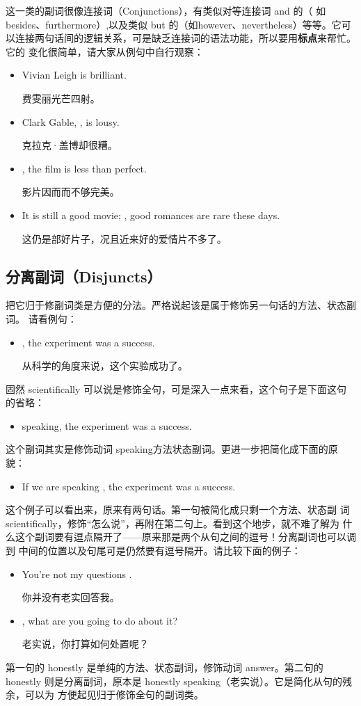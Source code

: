 这一类的副词很像连接词（Conjunctions），有类似对等连接词 and 的（
如besides、furthermore）,以及类似 but 的（如however、nevertheless）等等。它可
以连接两句话间的逻辑关系，可是缺乏连接词的语法功能，所以要用\textbf{标点}来帮忙。它的
变化很简单，请大家从例句中自行观察：

\begin{itemize}
\item Vivian Leigh is brilliant.

  费雯丽光芒四射。
\item Clark Gable, , is lousy.

  克拉克·盖博却很糟。
\item {}, the film is less than perfect.

  影片因而而不够完美。
\item  It is still a good movie; , good romances are rare these days.

  这仍是部好片子，况且近来好的爱情片不多了。
\end{itemize}

\subsection{分离副词（Disjuncts）}

把它归于修副词类是方便的分法。严格说起该是属于修饰另一句话的方法、状态副词。
请看例句：
\begin{itemize}
\item  {}, the experiment was a success.

  从科学的角度来说，这个实验成功了。
\end{itemize}
固然 scientifically 可以说是修饰全句，可是深入一点来看，这个句子是下面这句的省略：
\begin{itemize}
\item  {} speaking, the experiment was a success.
\end{itemize}
这个副词其实是修饰动词 speaking方法状态副词。更进一步把简化成下面的原貌：
\begin{itemize}
\item  If we are speaking , the experiment was a success.
\end{itemize}
这个例子可以看出来，原来有两句话。第一句被简化成只剩一个方法、状态副
词scientifically，修饰“怎么说”，再附在第二句上。看到这个地步，就不难了解为
什么这个副词要有逗点隔开了——原来那是两个从句之间的逗号！分离副词也可以调到
中间的位置以及句尾可是仍然要有逗号隔开。请比较下面的例子：
\begin{itemize}
\item  You're not  my questions .

  你并没有老实回答我。
\item  {}, what are you going to do about it?

  老实说，你打算如何处置呢？
\end{itemize}
第一句的 honestly 是单纯的方法、状态副词，修饰动词 answer。第二句的honestly
则是分离副词，原本是 honestly speaking（老实说）。它是简化从句的残余，可以为
方便起见归于修饰全句的副词类。



